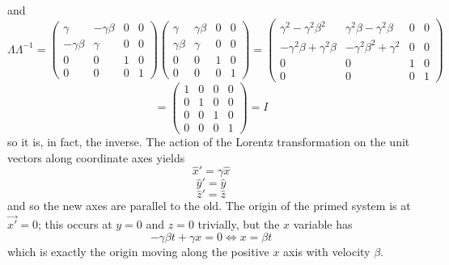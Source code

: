 \documentclass{article}
\begin{document}
and
\[
  \Lambda\Lambda^{-1}=
  \begin{pmatrix}
    \gamma & -\gamma\beta & 0 & 0 \\
    -\gamma\beta & \gamma & 0 & 0 \\
    0 & 0 & 1 & 0 \\
    0 & 0 & 0 & 1
  \end{pmatrix}
  \begin{pmatrix}
    \gamma & \gamma\beta & 0 & 0 \\
    \gamma\beta & \gamma & 0 & 0 \\
    0 & 0 & 1 & 0 \\
    0 & 0 & 0 & 1
  \end{pmatrix}
  =
  \begin{pmatrix}
    \gamma^{2}-\gamma^{2}\beta^{2} & \gamma^{2}\beta-\gamma^{2}\beta & 0 & 0 \\
    -\gamma^{2}\beta+\gamma^{2}\beta & -\gamma^{2}\beta^{2}+\gamma^{2} & 0 & 0 \\
    0 & 0 & 1 & 0 \\
    0 & 0 & 0 & 1
  \end{pmatrix}
\]
\[
  =
  \begin{pmatrix}
    1 & 0 & 0 & 0 \\
    0 & 1 & 0 & 0 \\
    0 & 0 & 1 & 0 \\
    0 & 0 & 0 & 1
  \end{pmatrix}
  =I
\]
so it is, in fact, the inverse.
The action of the Lorentz transformation on the unit vectors along coordinate axes yields
\[\hat{x}'=\gamma \hat{x}\]
\[\hat{y}'=\hat{y}\]
\[\hat{z}'=\hat{z}\]
and so the new axes are parallel to the old.
The origin of the primed system is at $\vec{x'}=0$; this occurs at $y=0$ and $z=0$ trivially, but the $x$ variable has
\[
  -\gamma\beta t+\gamma x=0
  \Leftrightarrow x = \beta t
\]
which is exactly the origin moving along the positive $x$ axis with velocity $\beta$.
\end{document}
